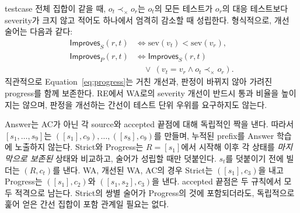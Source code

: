 \documentclass[10pt,conference]{IEEEtran}
\begin{document}
testcase 전체 집합이 같을 때, \(o_t\prec_\times o_r\)는 \(o_t\)의 모든 테스트가 \(o_r\)의 대응 테스트보다 severity가 크지 않고 적어도 하나에서 엄격히 감소할 때 성립한다. 형식적으로, 개선 술어는 다음과 같다:
\begin{equation}
\begin{aligned}
\mathsf{Improves}_S(r,t)&\iff \mathrm{sev}(v_t)<\mathrm{sev}(v_r),\\
\mathsf{Improves}_P(r,t)&\iff \mathsf{Improves}_S(r,t)\\
 &\quad\lor\ (v_t=v_r\land o_t\prec_\times o_r).
\end{aligned}
\label{eq:progress}
\end{equation}
직관적으로 Equation~\eqref{eq:progress}는 거친 개선과, 판정이 바뀌지 않아 가려진 progress를 함께 보존한다. RE에서 WA로의 severity 개선이 반드시 통과 비율을 높이지는 않으며, 판정을 개선하는 간선이 테스트 단위 우위를 요구하지도 않는다.

Answer는 AC가 아닌 각 source와 accepted 끝점에 대해 독립적인 짝을 낸다. 따라서 \([s_1,\ldots,s_9]\)는 \(([s_1],c_9),\ldots,([s_8],c_9)\)를 만들며, 누적된 prefix를 Answer 학습에 노출하지 않는다. Strict와 Progress는 \(R=[s_1]\)에서 시작해 이후 각 상태를 \emph{마지막으로 보존된} 상태와 비교하고, 술어가 성립할 때만 덧붙인다. \(s_t\)를 덧붙이기 전에 빌더는 \((R,c_t)\)를 낸다. WA, 개선된 WA, AC의 경우 Strict는 \(([s_1],c_3)\)을 내고 Progress는 \(([s_1],c_2)\)와 \(([s_1,s_2],c_3)\)을 낸다. accepted 끝점은 두 규칙에서 모두 적격으로 남는다. Strict의 쌍별 술어가 Progress의 것에 포함되더라도, 독립적으로 훑어 얻은 간선 집합이 포함 관계일 필요는 없다.
\end{document}
